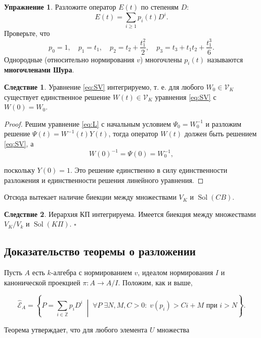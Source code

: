 \documentclass{article}
\theoremstyle{definition}
\theoremstyle{definition} %
\theoremstyle{remark}     %
\theoremstyle{definition}
\theoremstyle{definition}
\newtheorem*{corollary}{Следствие}
\theoremstyle{definition}
\theoremstyle{definition}
\theoremstyle{definition}
\theoremstyle{definition}
\theoremstyle{definition}
\theoremstyle{definition}
\newtheorem{exercise}{Упражнение}[section]
\begin{document}
\begin{exercise}
  Разложите оператор \( E(t) \) по степеням \( D \):
  \[
    E(t) = \sum_{i \geq 1} p_i(t)D^i.
  \]
  Проверьте, что
  \[
    p_0 = 1,\quad
    p_1 = t_1,\quad
    p_2 = t_2 + \frac{t_1^2}{2},\quad
    p_3 = t_3 + t_1t_2 + \frac{t_1^3}{6}.
  \]
  Однородные (относительно нормирования \( v \)) многочлены \( p_i(t) \) называются \textbf{многочленами Шура}.
\end{exercise}

\begin{corollary}
  Уравнение \ref{eq:SV} интегрируемо, т. е. для любого \( W_0 \in \mathcal{V}_K \) существует единственное решение \( W(t) \in \mathcal{V}_K \) уравнения \ref{eq:SV} с \( W(0) = W_0 \).
\end{corollary}

\begin{proof}
  Решим уравнение \ref{eq:L} с начальным условием \( \Psi_0 = W_0^{-1} \) и разложим решение \( \Psi(t) = W^{-1}(t)Y(t) \), тогда оператор \( W(t) \) должен быть решением \ref{eq:SV}, а
\[
  W(0)^{-1} = \Psi(0) = W_0^{-1},
\]

поскольку \( Y(0) = 1 \). Это решение единственно в силу единственности разложения и единственности решения линейного уравнения.

\end{proof}

Отсюда вытекает наличие биекции между множествами \( V_K \) и \( \operatorname{Sol}(CB) \).

\begin{corollary}
  Иерархия КП интегрируема. Имеется биекция между множествами \( V_K / V_k \) и \( \operatorname{Sol}(K\Pi) \). $\square$
\end{corollary}





\subsection{Доказательство теоремы о разложении}
Пусть \( A \) есть \( k \)-алгебра с нормированием \( v \), идеалом нормирования \( I \) и канонической проекцией \( \pi : A \to A/I \). Положим, как и выше,

\[
\hat{\mathcal{E}}_A = \left\{ P = \sum_{i \in \mathbb{Z}} p_i D^i \;\middle|\; \forall P \;\exists N, M, C > 0:\; v(p_i) > Ci + M \text{ при } i > N \right\}.
\]

Теорема утверждает, что для любого элемента \( U \) множества
\end{document}
